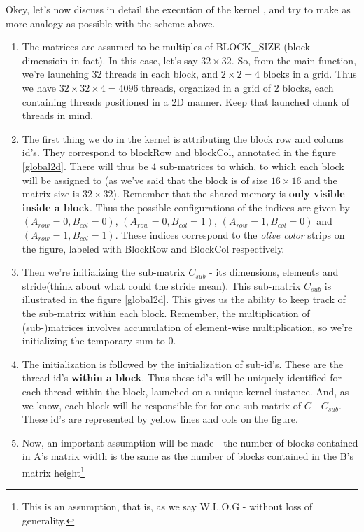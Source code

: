 \documentclass[12pt]{article}
\begin{document}
Okey, let's now discuss in detail the execution of the kernel \verb||, and try to make as more analogy as possible
with the scheme above.
\begin{enumerate}
   \item The matrices are assumed to be multiples of BLOCK\_SIZE (block dimensioin in fact). In this case, let's say $32\times 32$. So, 
   from the main function, we're launching 32 threads in each block, and $2\times 2 = 4$ blocks in a grid. Thus we have 
   $32\times 32\times 4=4096 \text{ threads}$, organized in a grid of 2 blocks, each containing threads 
   positioned in a 2D manner. Keep that launched chunk of threads in mind. 
   \item The first thing we do in the kernel is attributing the block row and colums id's. They correspond to blockRow and blockCol, 
   annotated in the figure \ref{global2d}. There will thus be 4 sub-matrices to which, to which each block will be assigned to (as we've said 
   that the block is of size $16\times 16$ and the matrix size is $32\times 32$). Remember that
   the shared memory is \textbf{only visible inside a block}. Thus the possible configurations of the indices are given by 
   $(A_{row}=0, B_{col}=0)$, $(A_{row}=0, B_{col}=1)$, $(A_{row}=1, B_{col}=0)$ and $(A_{row}=1, B_{col}=1)$. These indices correspond to the 
   \textit{olive color} strips on the figure, labeled with BlockRow and BlockCol respectively.
   \item Then we're initializing the sub-matrix $C_{sub}$ - its dimensions, elements and stride(think about what 
   could the stride mean). This sub-matrix $C_{sub}$ is illustrated in the figure \ref{global2d}. This gives us the ability to keep 
   track of the sub-matrix within each block. Remember, the multiplication 
   of (sub-)matrices involves accumulation of element-wise multiplication, so we're initializing the temporary sum to $0$.
   \item The initialization is followed by the initialization of sub-id's. These are the thread id's \textbf{within a block}.
   Thus these id's will be uniquely identified for each thread within the block, launched on a unique kernel instance. And, as we know, each block will be responsible for
   for one sub-matrix of $C$ - $C_{sub}$. These id's are represented by yellow lines and cols on the figure.
   \item Now, an important assumption will be made - the number of blocks contained in A's matrix width is the same as the number of 
   blocks contained in the B's matrix height\footnote{This is an assumption, that is, as we say W.L.O.G - without loss of generality. 
}
\end{enumerate}
\end{document}
